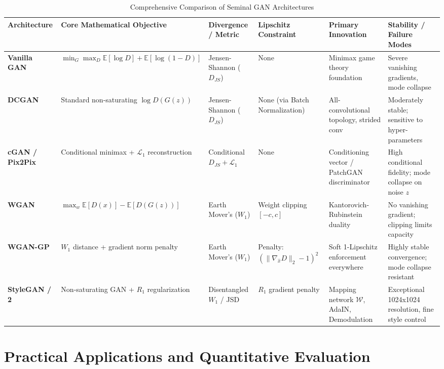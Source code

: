\documentclass[conference]{IEEEtran}
\begin{document}
\begin{table}[t]
\caption{Comprehensive Comparison of Seminal GAN Architectures}
\label{tab:gan_comparison}
\centering
\small
\begin{tabularx}{\textwidth}{lXXXXX}
\toprule
\textbf{Architecture} & \textbf{Core Mathematical Objective} & \textbf{Divergence / Metric} & \textbf{Lipschitz Constraint} & \textbf{Primary Innovation} & \textbf{Stability / Failure Modes} \\
\midrule
\textbf{Vanilla GAN} \cite{goodfellow2014generative} & $\min_G \max_D \mathbb{E}[\log D] + \mathbb{E}[\log(1-D)]$ & Jensen-Shannon ($D_{JS}$) & None & Minimax game theory foundation & Severe vanishing gradients, mode collapse \\
\textbf{DCGAN} \cite{radford2015unsupervised} & Standard non-saturating $\log D(G(z))$ & Jensen-Shannon ($D_{JS}$) & None (via Batch Normalization) & All-convolutional topology, strided conv & Moderately stable; sensitive to hyper-parameters \\
\textbf{cGAN / Pix2Pix} \cite{mirza2014conditional, isola2017image} & Conditional minimax + $\mathcal{L}_1$ reconstruction & Conditional $D_{JS} + \mathcal{L}_1$ & None & Conditioning vector / PatchGAN discriminator & High conditional fidelity; mode collapse on noise $z$ \\
\textbf{WGAN} \cite{arjovsky2017wasserstein} & $\max_{w} \mathbb{E}[D(x)] - \mathbb{E}[D(G(z))]$ & Earth Mover's ($W_1$) & Weight clipping $[-c, c]$ & Kantorovich-Rubinstein duality & No vanishing gradient; clipping limits capacity \\
\textbf{WGAN-GP} \cite{gulrajani2017improved} & $W_1$ distance + gradient norm penalty & Earth Mover's ($W_1$) & Penalty: $(\|\nabla_{\hat{x}} D\|_2 - 1)^2$ & Soft 1-Lipschitz enforcement everywhere & Highly stable convergence; mode collapse resistant \\
\textbf{StyleGAN / 2} \cite{karras2019style, karras2020analyzing} & Non-saturating GAN + $R_1$ regularization & Disentangled $W_1$ / JSD & $R_1$ gradient penalty & Mapping network $\mathcal{W}$, AdaIN, Demodulation & Exceptional 1024x1024 resolution, fine style control \\
\bottomrule
\end{tabularx}
\end{table}

\section{Practical Applications and Quantitative Evaluation}
\end{document}
